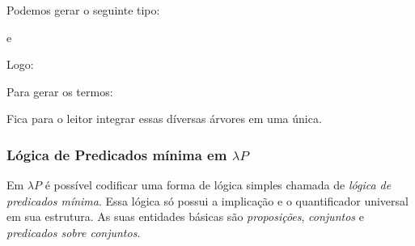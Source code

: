 \documentclass[../main.tex]{subfiles}
\begin{document}
Podemos gerar o seguinte tipo:

\begin{prooftree}
\end{prooftree}

e

\begin{prooftree}
\end{prooftree}

Logo:

\begin{prooftree}
\end{prooftree}


Para gerar os termos:

\begin{prooftree}
\end{prooftree}

Fica para o leitor integrar essas díversas árvores em uma única.

\subsubsection{Lógica de Predicados mínima em \texorpdfstring{$\lambda P$}{lP}}

Em $\lambda P$ é possível codificar uma forma de lógica simples chamada de \emph{lógica de predicados mínima}. Essa lógica só possui a implicação e o quantificador universal em sua estrutura. As suas entidades básicas são \emph{proposições}, \emph{conjuntos} e \emph{predicados sobre conjuntos}.
\end{document}
